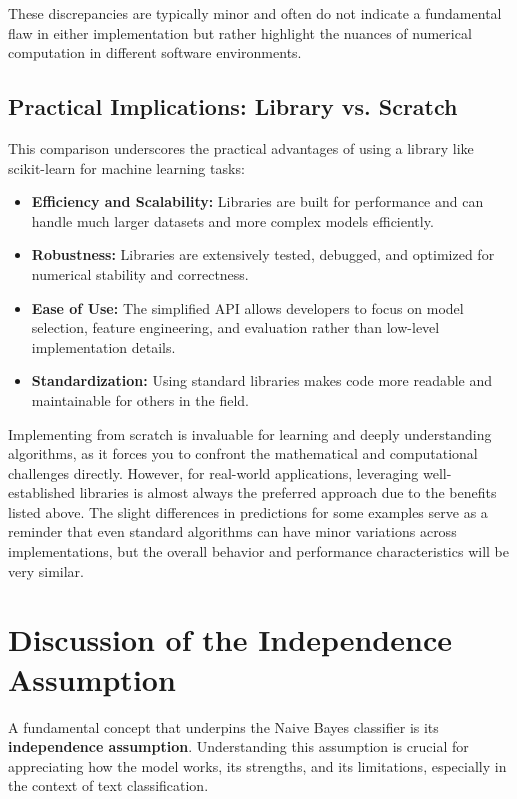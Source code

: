 \documentclass[12pt,letterpaper]{article}
\begin{document}
These discrepancies are typically minor and often do not indicate a fundamental flaw in either implementation but rather highlight the nuances of numerical computation in different software environments.

\subsection{Practical Implications: Library vs. Scratch}

This comparison underscores the practical advantages of using a library like scikit-learn for machine learning tasks:

\begin{itemize}
    \item \textbf{Efficiency and Scalability:} Libraries are built for performance and can handle much larger datasets and more complex models efficiently.
    
    \item \textbf{Robustness:} Libraries are extensively tested, debugged, and optimized for numerical stability and correctness.
    
    \item \textbf{Ease of Use:} The simplified API allows developers to focus on model selection, feature engineering, and evaluation rather than low-level implementation details.
    
    \item \textbf{Standardization:} Using standard libraries makes code more readable and maintainable for others in the field.
\end{itemize}

Implementing from scratch is invaluable for learning and deeply understanding algorithms, as it forces you to confront the mathematical and computational challenges directly. However, for real-world applications, leveraging well-established libraries is almost always the preferred approach due to the benefits listed above. The slight differences in predictions for some examples serve as a reminder that even standard algorithms can have minor variations across implementations, but the overall behavior and performance characteristics will be very similar.

\section{Discussion of the Independence Assumption}

A fundamental concept that underpins the Naive Bayes classifier is its \textbf{independence assumption}. Understanding this assumption is crucial for appreciating how the model works, its strengths, and its limitations, especially in the context of text classification.
\end{document}

